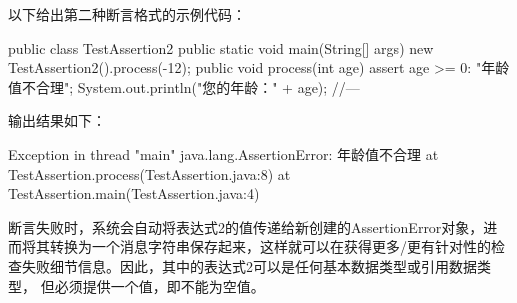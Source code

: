 以下给出第二种断言格式的示例代码：


\begin{javaCode}
public class TestAssertion2 {
  public static void main(String[] args) {
    new TestAssertion2().process(-12);
  }
  public void process(int age) {
    assert age >= 0: "年龄值不合理";
    System.out.println("您的年龄：" + age);
    //---
  }
}
\end{javaCode}

输出结果如下：

\begin{stdoutCode}
Exception in thread "main" java.lang.AssertionError: 年龄值不合理
	at TestAssertion.process(TestAssertion.java:8)
	at TestAssertion.main(TestAssertion.java:4)  
\end{stdoutCode}


断言失败时，系统会自动将表达式2的值传递给新创建的AssertionError对象，进
而将其转换为一个消息字符串保存起来，这样就可以在获得更多/更有针对性的检
查失败细节信息。因此，其中的表达式2可以是任何基本数据类型或引用数据类型，
但必须提供一个值，即不能为空值。


